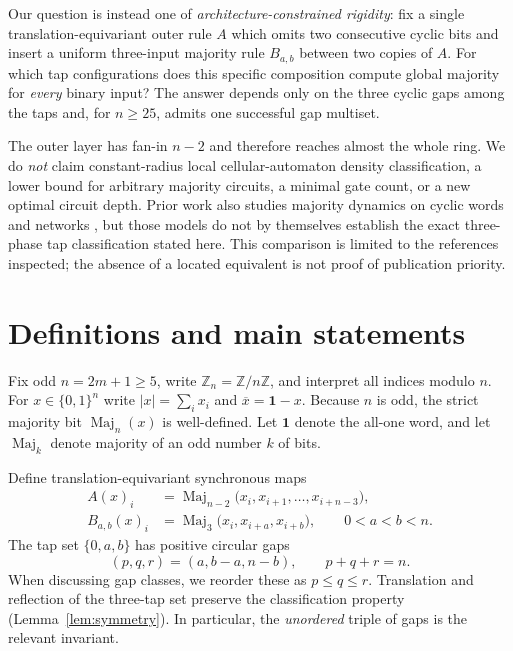 \documentclass[11pt,a4paper]{article}
\newcommand{\Maj}{\operatorname{Maj}}
\newcommand{\wt}[1]{\lvert #1\rvert}
\newcommand{\cZ}{\mathbb Z}
\newcommand{\ind}{\boldsymbol{1}}
\begin{document}
Our question is instead one of \emph{architecture-constrained rigidity}: fix a single translation-equivariant outer rule $A$ which omits two consecutive cyclic bits and insert a uniform three-input majority rule $B_{a,b}$ between two copies of $A$. For which tap configurations does this specific composition compute global majority for \emph{every} binary input? The answer depends only on the three cyclic gaps among the taps and, for $n\ge25$, admits one successful gap multiset.

The outer layer has fan-in $n-2$ and therefore reaches almost the whole ring. We do \emph{not} claim constant-radius local cellular-automaton density classification, a lower bound for arbitrary majority circuits, a minimal gate count, or a new optimal circuit depth. Prior work also studies majority dynamics on cyclic words and networks \cite{moran1994,abilhoa2020,perrotRolland2026,balbiEtAl2026}, but those models do not by themselves establish the exact three-phase tap classification stated here. This comparison is limited to the references inspected; the absence of a located equivalent is not proof of publication priority.

\section{Definitions and main statements}
Fix odd $n=2m+1\ge5$, write $\cZ_n=\cZ/n\cZ$, and interpret all indices modulo $n$. For $x\in\{0,1\}^n$ write $\wt{x}=\sum_i x_i$ and $\overline{x}=\ind-x$. Because $n$ is odd, the strict majority bit $\Maj_n(x)$ is well-defined. Let $\ind$ denote the all-one word, and let $\Maj_k$ denote majority of an odd number $k$ of bits.

Define translation-equivariant synchronous maps
\begin{align}
 A(x)_i &=\Maj_{n-2}\big(x_i,x_{i+1},\ldots,x_{i+n-3}\big),\label{eq:A}\\
 B_{a,b}(x)_i &=\Maj_3\big(x_i,x_{i+a},x_{i+b}\big),\qquad 0<a<b<n.\label{eq:B}
\end{align}
The tap set $\{0,a,b\}$ has positive circular gaps
\begin{equation}\label{eq:gaps}
(p,q,r)=(a,b-a,n-b),\qquad p+q+r=n.
\end{equation}
When discussing gap classes, we reorder these as $p\le q\le r$. Translation and reflection of the three-tap set preserve the classification property (Lemma~\ref{lem:symmetry}). In particular, the \emph{unordered} triple of gaps is the relevant invariant.
\end{document}
